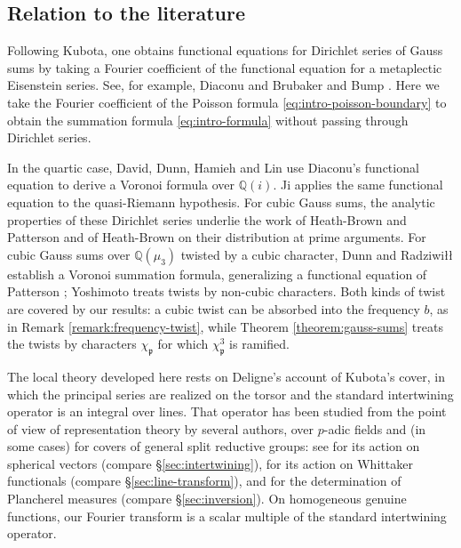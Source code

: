 \documentclass[reqno]{amsart}
\theoremstyle{plain}
\theoremstyle{definition}
\theoremstyle{itplain}
\numberwithin{equation}{section}
\numberwithin{theorem}{section}
\begin{document}
\subsection{Relation to the literature}\label{sec:literature}
Following Kubota, one obtains functional equations for Dirichlet series of Gauss sums by taking a Fourier coefficient of the functional equation for a metaplectic Eisenstein series.  See, for example, Diaconu \cite[(2.48)]{Diaconu_2004} and Brubaker and Bump \cite[Theorem 1]{MR2270571}.  Here we take the Fourier coefficient of the Poisson formula \eqref{eq:intro-poisson-boundary} to obtain the summation formula \eqref{eq:intro-formula} without passing through Dirichlet series.

In the quartic case, David, Dunn, Hamieh and Lin \cite{2023arXiv2306.11875} use Diaconu's functional equation to derive a Voronoi formula over \(\mathbb Q(i)\).  Ji \cite{2026arXiv2611.16665} applies the same functional equation to the quasi-Riemann hypothesis.  For cubic Gauss sums, the analytic properties of these Dirichlet series underlie the work of Heath-Brown and Patterson \cite{HeathBrownPatterson1979} and of Heath-Brown \cite{MR1815372} on their distribution at prime arguments.  For cubic Gauss sums over $\mathbb{Q}(\mu_3)$ twisted by a cubic character, Dunn and Radziwi\l\l{} \cite[\S5]{MR4816436} establish a Voronoi summation formula, generalizing a functional equation of Patterson \cite[Theorem~6.1]{Patterson1977CubicTheta}; Yoshimoto \cite{Yoshimoto1987} treats twists by non-cubic characters.  Both kinds of twist are covered by our results: a cubic twist can be absorbed into the frequency $b$, as in Remark \ref{remark:frequency-twist}, while Theorem \ref{theorem:gauss-sums} treats the twists by characters $\chi_{\mathfrak{p}}$ for which $\chi_{\mathfrak{p}}^3$ is ramified.

The local theory developed here rests on Deligne's account \cite{SB_1978-1979__21__244_0} of Kubota's cover, in which the principal series are realized on the torsor and the standard intertwining operator is an integral over lines.  That operator has been studied from the point of view of representation theory by several authors, over $p$-adic fields and (in some cases) for covers of general split reductive groups: see \cite{McNamara2012PrincipalSeries} for its action on spherical vectors (compare \S\ref{sec:intertwining}), \cite{Szpruch2019, GaoShahidiSzpruch2023} for its action on Whittaker functionals (compare \S\ref{sec:line-transform}), and \cite{MR3544420, Szpruch2019} for the determination of Plancherel measures (compare \S\ref{sec:inversion}).  On homogeneous genuine functions, our Fourier transform is a scalar multiple of the standard intertwining operator.
\end{document}
